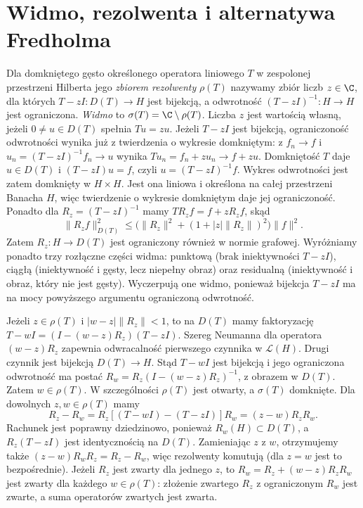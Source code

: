 \section{Widmo, rezolwenta i alternatywa Fredholma}
\label{sec:pde12-fredholm}

\begin{definicja}
\label{def:pde12-spectrum}
Dla domkniętego gęsto określonego operatora liniowego $T$ w
zespolonej przestrzeni Hilberta jego \emph{zbiorem rezolwenty}
$\rho(T)$ nazywamy zbiór liczb $z\in\C$, dla których
$T-zI:D(T)\to H$ jest bijekcją, a odwrotność
$(T-zI)^{-1}:H\to H$ jest ograniczona.
\emph{Widmo} to $\sigma(T)=\C\setminus\rho(T)$.
Liczba $z$ jest wartością własną, jeżeli
$0\ne u\in D(T)$ spełnia $Tu=zu$.
Jeżeli $T-zI$ jest bijekcją, ograniczoność odwrotności
wynika już z twierdzenia o wykresie domkniętym:
z $f_n\to f$ i $u_n=(T-zI)^{-1}f_n\to u$ wynika
$Tu_n=f_n+zu_n\to f+zu$. Domkniętość $T$ daje
$u\in D(T)$ i $(T-zI)u=f$, czyli $u=(T-zI)^{-1}f$.
Wykres odwrotności jest zatem domknięty w $H\times H$.
Jest ona liniowa i określona na całej przestrzeni Banacha
$H$, więc twierdzenie o wykresie domkniętym daje
jej ograniczoność. Ponadto dla $R_z=(T-zI)^{-1}$ mamy
$TR_zf=f+zR_zf$, skąd
\[
 \|R_zf\|_{D(T)}^2
 \le\bigl(\|R_z\|^2+(1+|z|\|R_z\|)^2\bigr)\|f\|^2.
\]
Zatem $R_z:H\to D(T)$ jest ograniczony również
w normie grafowej. Wyróżniamy ponadto trzy rozłączne
części widma: punktową (brak iniektywności $T-zI$),
ciągłą (iniektywność i gęsty, lecz niepełny obraz)
oraz residualną (iniektywność i obraz, który nie jest
gęsty). Wyczerpują one widmo, ponieważ bijekcja
$T-zI$ ma na mocy powyższego argumentu ograniczoną
odwrotność.
\end{definicja}

\begin{uwaga}
Jeżeli $z\in\rho(T)$ i $|w-z|\|R_z\|<1$, to
na $D(T)$ mamy faktoryzację
$T-wI=(I-(w-z)R_z)(T-zI)$.
Szereg Neumanna dla operatora $(w-z)R_z$ zapewnia
odwracalność pierwszego czynnika w $\mathcal L(H)$.
Drugi czynnik jest bijekcją $D(T)\to H$.
Stąd $T-wI$ jest bijekcją i jego ograniczona odwrotność
ma postać $R_w=R_z(I-(w-z)R_z)^{-1}$, z obrazem
w $D(T)$. Zatem $w\in\rho(T)$. W szczególności
$\rho(T)$ jest otwarty, a $\sigma(T)$ domknięte.
Dla dowolnych $z,w\in\rho(T)$ mamy
\[
 R_z-R_w=R_z[(T-wI)-(T-zI)]R_w
 =(z-w)R_zR_w.
\]
Rachunek jest poprawny dziedzinowo, ponieważ
$R_w(H)\subset D(T)$, a $R_z(T-zI)$ jest identycznością
na $D(T)$. Zamieniając $z$ z $w$, otrzymujemy
także $(z-w)R_wR_z=R_z-R_w$, więc rezolwenty komutują
(dla $z=w$ jest to bezpośrednie).
Jeżeli $R_z$ jest zwarty dla jednego $z$,
to $R_w=R_z+(w-z)R_zR_w$ jest zwarty dla każdego
$w\in\rho(T)$: złożenie zwartego $R_z$ z ograniczonym
$R_w$ jest zwarte, a suma operatorów zwartych
jest zwarta.
\end{uwaga}

